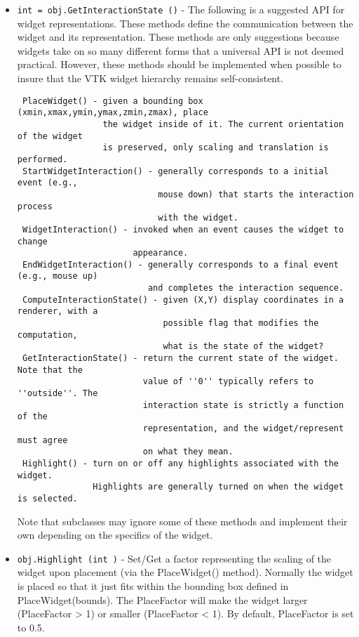\begin{itemize}
\item  \verb|int = obj.GetInteractionState ()| -  The following is a suggested API for widget representations. These methods
 define the communication between the widget and its representation. These
 methods are only suggestions because widgets take on so many different
 forms that a universal API is not deemed practical. However, these methods
 should be implemented when possible to insure that the VTK widget hierarchy
 remains self-consistent.
 \begin{verbatim}
 PlaceWidget() - given a bounding box (xmin,xmax,ymin,ymax,zmin,zmax), place 
                 the widget inside of it. The current orientation of the widget 
                 is preserved, only scaling and translation is performed.
 StartWidgetInteraction() - generally corresponds to a initial event (e.g.,
                            mouse down) that starts the interaction process
                            with the widget.
 WidgetInteraction() - invoked when an event causes the widget to change 
                       appearance.
 EndWidgetInteraction() - generally corresponds to a final event (e.g., mouse up)
                          and completes the interaction sequence.
 ComputeInteractionState() - given (X,Y) display coordinates in a renderer, with a
                             possible flag that modifies the computation,
                             what is the state of the widget?
 GetInteractionState() - return the current state of the widget. Note that the
                         value of ''0'' typically refers to ''outside''. The 
                         interaction state is strictly a function of the
                         representation, and the widget/represent must agree
                         on what they mean.
 Highlight() - turn on or off any highlights associated with the widget.
               Highlights are generally turned on when the widget is selected.
 \end{verbatim}
 Note that subclasses may ignore some of these methods and implement their own
 depending on the specifics of the widget.

\item  \verb|obj.Highlight (int )| -  Set/Get a factor representing the scaling of the widget upon placement
 (via the PlaceWidget() method). Normally the widget is placed so that
 it just fits within the bounding box defined in PlaceWidget(bounds).
 The PlaceFactor will make the widget larger (PlaceFactor > 1) or smaller
 (PlaceFactor < 1). By default, PlaceFactor is set to 0.5.


\end{itemize}
